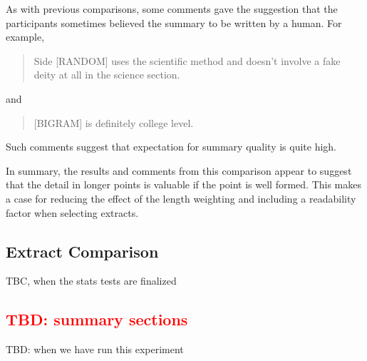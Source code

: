       As with previous comparisons, some comments gave the suggestion that the participants sometimes believed the summary to be written by a human. For example, \blockquote{Side [RANDOM] uses the scientific method and doesn't involve a fake deity at all in the science section.} and \blockquote{[BIGRAM] is definitely college level.}. Such comments suggest that expectation for summary quality is quite high.

      In summary, the results and comments from this comparison appear to suggest that the detail in longer points is valuable if the point is well formed. This makes a case for reducing the effect of the length weighting and including a readability factor when selecting extracts.

    \tocless\subsection{Extract Comparison}
      TBC, when the stats tests are finalized
    \tocless\subsection{\textcolor{red}{TBD: summary sections}}
      TBD: when we have run this experiment
